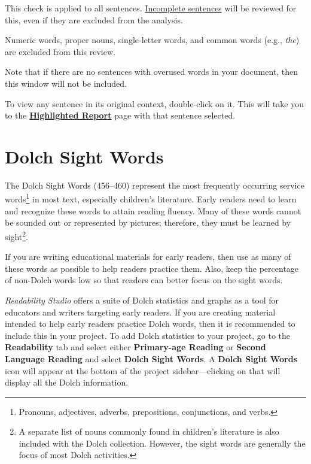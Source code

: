 \documentclass[
]{book}
\theoremstyle{definition}
\theoremstyle{definition}
\theoremstyle{definition}
\theoremstyle{definition}
\theoremstyle{remark}
\begin{document}
This check is applied to all sentences. \protect\hyperlink{how-text-is-excluded}{Incomplete sentences} will be reviewed for this, even if they are excluded from the analysis.

Numeric words, proper nouns, single-letter words, and common words (e.g., \emph{the}) are excluded from this review.

Note that if there are no sentences with overused words in your document, then this window will not be included.

To view any sentence in its original context, double-click on it. This will take you to the \protect\hyperlink{reviewing-standard-grammar}{\textbf{Highlighted Report}} page with that sentence selected.

\hypertarget{reviewing-dolch}{%
\section{Dolch Sight Words}\label{reviewing-dolch}}

The Dolch Sight Words (456--460) represent the most frequently occurring service words\footnote{Pronouns, adjectives, adverbs, prepositions, conjunctions, and verbs.} in most text, especially children's literature. Early readers need to learn and recognize these words to attain reading fluency. Many of these words cannot be sounded out or represented by pictures; therefore, they must be learned by sight\footnote{A separate list of nouns commonly found in children's literature is also included with the Dolch collection. However, the sight words are generally the focus of most Dolch activities.}.

If you are writing educational materials for early readers, then use as many of these words as possible to help readers practice them. Also, keep the percentage of non-Dolch words low so that readers can better focus on the sight words.

\emph{Readability Studio} offers a suite of Dolch statistics and graphs as a tool for educators and writers targeting early readers. If you are creating material intended to help early readers practice Dolch words, then it is recommended to include this in your project. To add Dolch statistics to your project, go to the \textbf{Readability} tab and select either \textbf{Primary-age Reading} or \textbf{Second Language Reading} and select \textbf{Dolch Sight Words}. A \textbf{Dolch Sight Words} icon will appear at the bottom of the project sidebar---clicking on that will display all the Dolch information.
\end{document}
